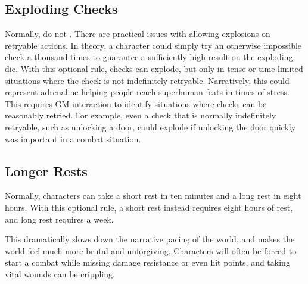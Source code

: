     \subsection{Exploding Checks}
        Normally,  do not .
        There are practical issues with allowing explosions on retryable actions.
        In theory, a character could simply try an otherwise impossible check a thousand times to guarantee a sufficiently high result on the exploding die.
        With this optional rule, checks can explode, but only in tense or time-limited situations where the check is not indefinitely retryable.
        Narratively, this could represent adrenaline helping people reach superhuman feats in times of stress.
        This requires GM interaction to identify situations where checks can be reasonably retried.
        For example, even a check that is normally indefinitely retryable, such as unlocking a door, could explode if unlocking the door quickly was important in a combat situation.

    \subsection{Longer Rests}\label{Longer Rests}
        Normally, characters can take a short rest in ten minutes and a long rest in eight hours.
        With this optional rule, a short rest instead requires eight hours of rest, and long rest requires a week.

        This dramatically slows down the narrative pacing of the world, and makes the world feel much more brutal and unforgiving.
        Characters will often be forced to start a combat while missing damage resistance or even hit points, and taking vital wounds can be crippling.

